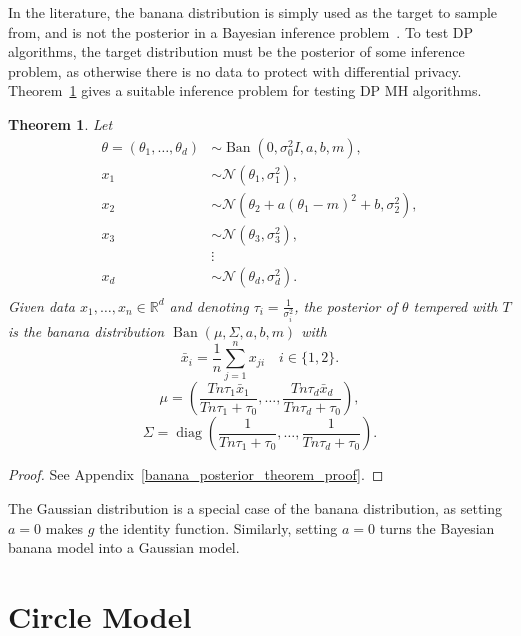 \documentclass[english,twoside,openright]{HYgraduMLDS}
\newtheorem{theorem}[lemma]{Theorem}
\newcommand{\R}{\mathbb{R}}
\newcommand{\caln}{{\mathcal{N}}}
\DeclareMathOperator{\ban}{Ban}
\DeclareMathOperator{\diag}{diag}
\begin{document}
In the literature, the banana distribution is simply used as the target to
sample from, and is not the posterior in a Bayesian inference
problem~\cite{TPK14}. To test DP algorithms, the
target distribution must be the posterior of some inference problem, as
otherwise there is no data to protect with differential privacy.
Theorem~\ref{banana_posterior_theorem} gives a suitable inference problem
for testing DP MH algorithms.

\begin{theorem}\label{banana_posterior_theorem}
    Let
    \begin{align*}
        \theta = (\theta_1,\dotsc, \theta_d) &\sim
        \ban(0, \sigma_0^2I, a, b, m), \\
        x_1 &\sim \caln(\theta_1, \sigma_1^2), \\
        x_2 &\sim \caln(\theta_2 + a(\theta_1 - m)^2 + b, \sigma_2^2),\\
        x_3 &\sim \caln(\theta_3, \sigma_3^2), \\
            &\vdots \\
        x_d &\sim \caln(\theta_d, \sigma_d^2). \\
    \end{align*}
    Given data \(x_1,\dotsc, x_n\in \R^d\) and
    denoting \(\tau_i = \frac{1}{\sigma_i^2}\),
    the posterior of \(\theta\) tempered with \(T\) is the banana distribution
    \(\ban(\mu, \Sigma, a, b, m)\)
    with
    \[
        \bar{x}_i = \frac{1}{n}\sum_{j=1}^n x_{ji} \quad i\in \{1, 2\}.
    \]
    \[
        \mu = \left(\frac{Tn\tau_1\bar{x}_1}{Tn\tau_1 + \tau_0},\dotsc,
        \frac{Tn\tau_d\bar{x}_d}{Tn\tau_d + \tau_0}\right),
    \]
    \[
        \Sigma = \diag\left(
            \frac{1}{Tn\tau_1 + \tau_0},\dotsc,
            \frac{1}{Tn\tau_d + \tau_0}
        \right).
    \]
\end{theorem}
\begin{proof}
  See Appendix~\ref{banana_posterior_theorem_proof}.
\end{proof}
\setcounter{banana_posterior_theorem_number}{\value{lemma}}

The Gaussian distribution is a special case of the banana distribution,
as setting \(a = 0\) makes \(g\) the identity function. Similarly, setting
\(a = 0\) turns the Bayesian banana model into a Gaussian model.

\section{Circle Model}\label{circle_section}
\end{document}
